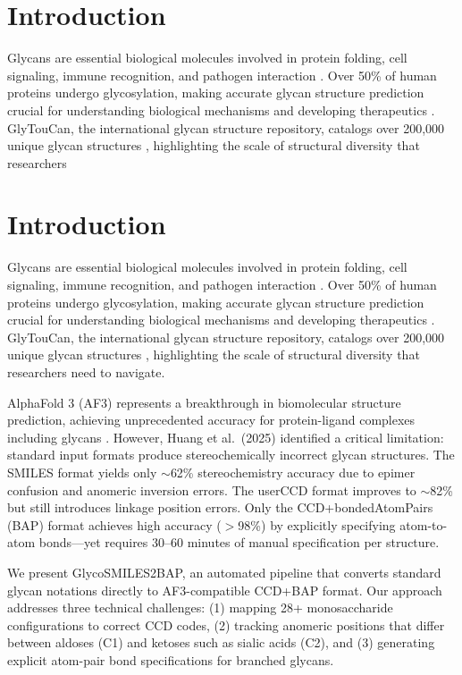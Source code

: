 \documentclass[11pt,a4paper]{article}
\begin{document}
\section{Introduction}

Glycans are essential biological molecules involved in protein folding, cell signaling, immune recognition, and pathogen interaction \citep{varki2017}. Over 50\% of human proteins undergo glycosylation, making accurate glycan structure prediction crucial for understanding biological mechanisms and developing therapeutics \citep{helenius2004}. GlyTouCan, the international glycan structure repository, catalogs over 200,000 unique glycan structures \citep{tiemeyer2016}, highlighting the scale of structural diversity that researchers%
\section{Introduction}

Glycans are essential biological molecules involved in protein folding, cell signaling, immune recognition, and pathogen interaction \citep{varki2017}. Over 50\% of human proteins undergo glycosylation, making accurate glycan structure prediction crucial for understanding biological mechanisms and developing therapeutics \citep{helenius2004}. GlyTouCan, the international glycan structure repository, catalogs over 200,000 unique glycan structures \citep{tiemeyer2016}, highlighting the scale of structural diversity that researchers need to navigate.

AlphaFold 3 (AF3) represents a breakthrough in biomolecular structure prediction, achieving unprecedented accuracy for protein-ligand complexes including glycans \citep{abramson2024}. However, Huang et al.\ (2025) identified a critical limitation: standard input formats produce stereochemically incorrect glycan structures. The SMILES format yields only $\sim$62\% stereochemistry accuracy due to epimer confusion and anomeric inversion errors. The userCCD format improves to $\sim$82\% but still introduces linkage position errors. Only the CCD+bondedAtomPairs (BAP) format achieves high accuracy ($>$98\%) by explicitly specifying atom-to-atom bonds---yet requires 30--60 minutes of manual specification per structure.

We present GlycoSMILES2BAP, an automated pipeline that converts standard glycan notations directly to AF3-compatible CCD+BAP format. Our approach addresses three technical challenges: (1) mapping 28+ monosaccharide configurations to correct CCD codes, (2) tracking anomeric positions that differ between aldoses (C1) and ketoses such as sialic acids (C2), and (3) generating explicit atom-pair bond specifications for branched glycans.
\end{document}
